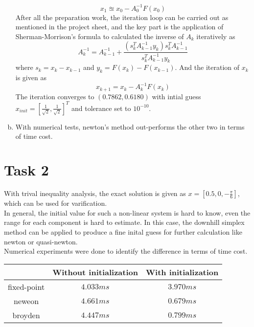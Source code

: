 \documentclass[paper=a4, fontsize=11pt]{scrartcl} %
\numberwithin{equation}{section} %
\numberwithin{figure}{section} %
\numberwithin{table}{section} %
\begin{document}
\begin{enumerate}[(a)]
			\begin{equation}
				x_1 \approxeq x_0 - A_0^{-1}F(x_0)
			\end{equation}
			After all the preparation work, the iteration loop can be carried out as mentioned in the project sheet, and the key part is the application of Sherman-Morrison's formula to calculated the inverse of $A_k$ iteratively as
			\begin{equation}
				A_k^{-1} = A_{k-1}^{-1} + \frac{(s_k^T A_{k-1}^{-1} y_k)s_k^T A_{k-1}^{-1}}{s_k^T A_{k-1}^{-1} y_k}
			\end{equation}
			where $s_k = x_k - x_{k-1}$ and $y_k = F(x_k) - F(x_{k-1})$. And the iteration of $x_k$ is given as
			\begin{equation}
				x_{k+1} = x_k - A_k^{-1}F(x_k)
			\end{equation}
			The iteration converges to $(0.7862, 0.6180)$ with intial guess $x_{init} = [\frac{1}{\sqrt{2}}, \frac{1}{\sqrt{2}}]^T$ and tolerance set to $10^{-10}$. 
		\item 
			With numerical tests, newton's method out-performs the other two in terms of time cost.
		
	\end{enumerate}

\section{Task 2}
	With trival inequality analysis, the exact solution is given as $x=[0.5, 0, -\frac{\pi}{6}]$, which can be used for varification.\\
	In general, the initial value for such a non-linear system is hard to know, even the range for each component is hard to estimate. In this case, the downhill simplex method can be applied to produce a fine inital guess for further calculation like newton or quasi-newton.\\
	Numerical experiments were done to identify the difference in terms of time cost. 
	
	\begin{center}
		\begin{tabular}{ccc}
			\hline
			\quad       & Without initialization & With initialization\\
			\hline
			fixed-point & $4.033 ms$             & $3.970 ms$\\
			neweon      & $4.661 ms$             & $0.679 ms$\\
			broyden     & $4.447 ms$             & $0.799 ms$\\
			\hline
		\end{tabular}
	\end{center}
	
\end{document}
